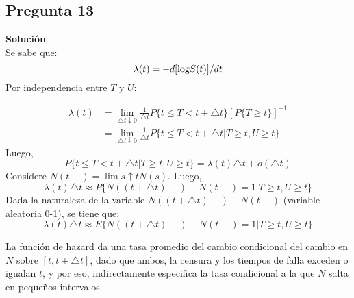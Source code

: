 \documentclass[10pt]{article}\usepackage[]{graphicx}\usepackage[]{color}
\begin{document}
{\begin{itemize}
\end{itemize}


\subsection*{Pregunta 13} 
\textbf{Solución}\\
Se sabe que:
$$\lambda(t)=-d[\textnormal{log}S(t)]/dt$$
Por independencia entre $T$ y $U$: 

\begin{align*}
\lambda(t) & =\lim_{\triangle t \downarrow 0}{\frac{1}{\triangle t} P\{t\leq T < t+\triangle t\}[P\{T\geq t\}]^{-1}}\\
 & =\lim_{\triangle t \downarrow 0}{\frac{1}{\triangle t} P\{t\leq T < t+\triangle t|T\geq t,U\geq t\}}
\end{align*}
Luego,
$$P\{t\leq T < t+\triangle t|T\geq t,U\geq t\}=\lambda(t)\triangle t+o(\triangle t)$$ 
Considere $N(t-)=\lim{s \uparrow t}{N(s)}$. Luego,
$$\lambda(t)\triangle t \approx P\{N((t+\triangle t)-)-N(t-)=1|T\geq t,U\geq t\}$$
Dada la naturaleza de la variable $N((t+\triangle t)-)-N(t-)$ (variable aleatoria 0-1), se tiene que:
$$\lambda(t)\triangle t \approx E\{N((t+\triangle t)-)-N(t-)=1|T\geq t,U\geq t\}$$

La función de hazard da una tasa promedio del cambio condicional del cambio en $N$ sobre $[t,t+\triangle t]$, dado que ambos, la censura y los tiempos de falla exceden o igualan $t$, y por eso, indirectamente especifica la tasa condicional a la que $N$ salta en pequeños intervalos.
}
\end{document}
